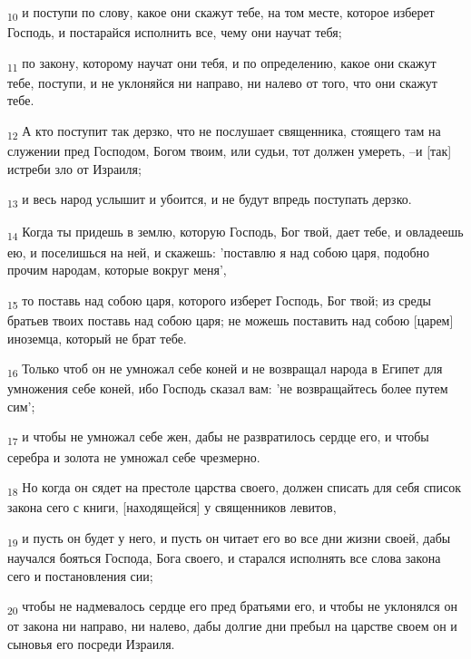 \begin{tcolorbox}
\textsubscript{10} и поступи по слову, какое они скажут тебе, на том месте, которое изберет Господь, и постарайся исполнить все, чему они научат тебя;
\end{tcolorbox}
\begin{tcolorbox}
\textsubscript{11} по закону, которому научат они тебя, и по определению, какое они скажут тебе, поступи, и не уклоняйся ни направо, ни налево от того, что они скажут тебе.
\end{tcolorbox}
\begin{tcolorbox}
\textsubscript{12} А кто поступит так дерзко, что не послушает священника, стоящего там на служении пред Господом, Богом твоим, или судьи, тот должен умереть, --и [так] истреби зло от Израиля;
\end{tcolorbox}
\begin{tcolorbox}
\textsubscript{13} и весь народ услышит и убоится, и не будут впредь поступать дерзко.
\end{tcolorbox}
\begin{tcolorbox}
\textsubscript{14} Когда ты придешь в землю, которую Господь, Бог твой, дает тебе, и овладеешь ею, и поселишься на ней, и скажешь: 'поставлю я над собою царя, подобно прочим народам, которые вокруг меня',
\end{tcolorbox}
\begin{tcolorbox}
\textsubscript{15} то поставь над собою царя, которого изберет Господь, Бог твой; из среды братьев твоих поставь над собою царя; не можешь поставить над собою [царем] иноземца, который не брат тебе.
\end{tcolorbox}
\begin{tcolorbox}
\textsubscript{16} Только чтоб он не умножал себе коней и не возвращал народа в Египет для умножения себе коней, ибо Господь сказал вам: 'не возвращайтесь более путем сим';
\end{tcolorbox}
\begin{tcolorbox}
\textsubscript{17} и чтобы не умножал себе жен, дабы не развратилось сердце его, и чтобы серебра и золота не умножал себе чрезмерно.
\end{tcolorbox}
\begin{tcolorbox}
\textsubscript{18} Но когда он сядет на престоле царства своего, должен списать для себя список закона сего с книги, [находящейся] у священников левитов,
\end{tcolorbox}
\begin{tcolorbox}
\textsubscript{19} и пусть он будет у него, и пусть он читает его во все дни жизни своей, дабы научался бояться Господа, Бога своего, и старался исполнять все слова закона сего и постановления сии;
\end{tcolorbox}
\begin{tcolorbox}
\textsubscript{20} чтобы не надмевалось сердце его пред братьями его, и чтобы не уклонялся он от закона ни направо, ни налево, дабы долгие дни пребыл на царстве своем он и сыновья его посреди Израиля.
\end{tcolorbox}
